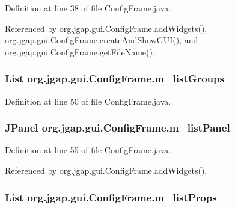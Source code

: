 Definition at line 38 of file Config\-Frame.\-java.



Referenced by org.\-jgap.\-gui.\-Config\-Frame.\-add\-Widgets(), org.\-jgap.\-gui.\-Config\-Frame.\-create\-And\-Show\-G\-U\-I(), and org.\-jgap.\-gui.\-Config\-Frame.\-get\-File\-Name().

\hypertarget{classorg_1_1jgap_1_1gui_1_1_config_frame_aa4f34f2ed29abfdf8557ef2afa27b0f2}{
\subsubsection[{m\-\_\-list\-Groups}]{\setlength{\rightskip}{0pt plus 5cm}List org.\-jgap.\-gui.\-Config\-Frame.\-m\-\_\-list\-Groups\hspace{0.3cm}{\ttfamily [private]}}}\label{classorg_1_1jgap_1_1gui_1_1_config_frame_aa4f34f2ed29abfdf8557ef2afa27b0f2}


Definition at line 50 of file Config\-Frame.\-java.

\hypertarget{classorg_1_1jgap_1_1gui_1_1_config_frame_aebbee8dd64cd6e2d2a0fa5bf11c2da16}{
\subsubsection[{m\-\_\-list\-Panel}]{\setlength{\rightskip}{0pt plus 5cm}J\-Panel org.\-jgap.\-gui.\-Config\-Frame.\-m\-\_\-list\-Panel\hspace{0.3cm}{\ttfamily [private]}}}\label{classorg_1_1jgap_1_1gui_1_1_config_frame_aebbee8dd64cd6e2d2a0fa5bf11c2da16}


Definition at line 55 of file Config\-Frame.\-java.



Referenced by org.\-jgap.\-gui.\-Config\-Frame.\-add\-Widgets().

\hypertarget{classorg_1_1jgap_1_1gui_1_1_config_frame_af9a22e41c6f8e0db03140b1fb05426aa}{
\subsubsection[{m\-\_\-list\-Props}]{\setlength{\rightskip}{0pt plus 5cm}List org.\-jgap.\-gui.\-Config\-Frame.\-m\-\_\-list\-Props\hspace{0.3cm}{\ttfamily [private]}}}\label{classorg_1_1jgap_1_1gui_1_1_config_frame_af9a22e41c6f8e0db03140b1fb05426aa}


